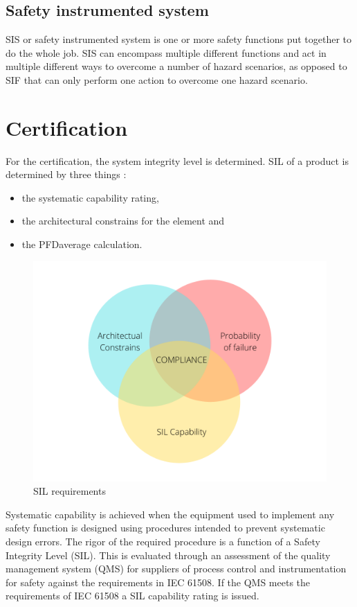 \subsection{Safety instrumented system}
\label{sec:sis}

SIS or safety instrumented system is one or more safety functions put together to do the whole job. SIS can encompass multiple different functions and act in multiple different ways to overcome a number of hazard scenarios, as opposed to SIF that can only perform one action to overcome one hazard scenario.

\section{Certification}


For the certification, the system integrity level is determined. SIL of a product is determined by three things \citep{func_safety_fundamentals}:
\begin{itemize}

    \item the systematic capability rating,
    \item the architectural constrains for the element and
    \item the PFDaverage calculation.
    
\end{itemize}

\begin{figure}[H]

      \centering
      \includegraphics[width=0.7\linewidth]{images/sil_requirements.png}
      \caption{SIL requirements}
      \label{fig:sil_requirements}
    
\end{figure}

Systematic capability is achieved when the equipment used to implement any safety function is designed using procedures intended to prevent systematic design errors.  The rigor of the required procedure is a function of a Safety Integrity Level (SIL). This is evaluated through an assessment of the quality management system (QMS) for suppliers of process control and instrumentation for safety against the requirements in IEC 61508.  If the QMS meets the requirements of IEC 61508 a SIL capability rating is issued. 

